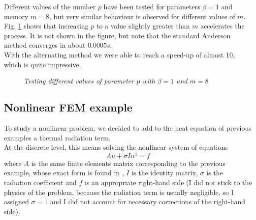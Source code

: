 \documentclass[12pt]{article}
\begin{document}
			Different values of the number $p$ have been tested for parameters $\beta=1$ and memory $m=8$, but very similar behaviour
			is observed for different values of $m$. Fig. \ref{fig:tab1} shows that increasing $p$ to a value slightly greater than
			$m$ accelerates the process. It is not shown in the figure, but note that the standard Anderson method converges in
			about $0.0005 s$.\\
			With the alternating method we were able to reach a speed-up of almost 10, which is quite impressive.
			
			
			\begin{figure}
			{\scriptsize
			}
			\centering
			\caption{\textit{Testing different values of parameter $p$ with $\beta=1$ and $m=8$}}
			\label{fig:tab1}
			\end{figure}
			
			
			
			\subsection{Nonlinear FEM example}
			To study a nonlinear problem, we decided to add to the heat equation of previous examples a thermal radiation term.\\
			At the discrete level, this means solving the nonlinear system of equations
			\begin{equation}
				\label{eq:non}
				A u + \sigma I u^4 = f
			\end{equation}
			where $A$ is the same finite elements matrix corresponding to the previous example, whose exact form is found in
			\cite{Formaggia}, $I$ is the identity matrix, $\sigma$ is the radiation coefficient and $f$ is an
			appropriate right-hand side (I did not stick to the physics of the problem, because the radiation term
			is usually negligible, so I assigned $\sigma=1$ and I did not account for necessary corrections of the right-hand
			side).
			
\end{document}
